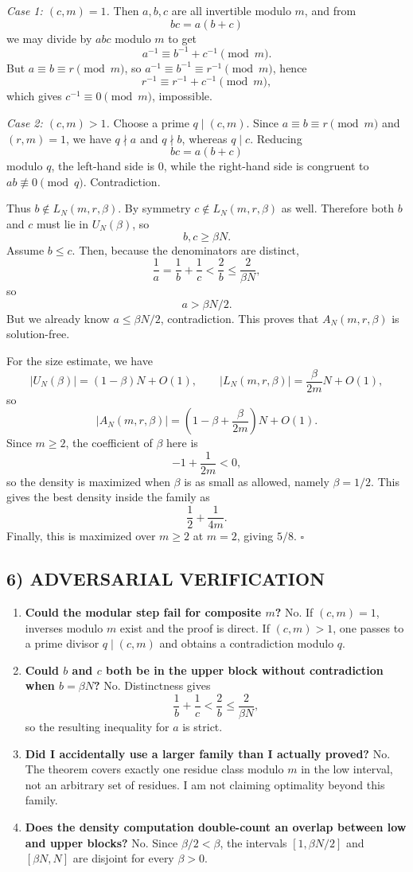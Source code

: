 \smallskip
\emph{Case 1: \((c,m)=1\).}
Then \(a,b,c\) are all invertible modulo \(m\), and from
\[
  bc=a(b+c)
\]
we may divide by \(abc\) modulo \(m\) to get
\[
  a^{-1}\equiv b^{-1}+c^{-1}\pmod m.
\]
But \(a\equiv b\equiv r\pmod m\), so \(a^{-1}\equiv b^{-1}\equiv r^{-1}\pmod m\), hence
\[
  r^{-1}\equiv r^{-1}+c^{-1}\pmod m,
\]
which gives \(c^{-1}\equiv 0\pmod m\), impossible.

\smallskip
\emph{Case 2: \((c,m)>1\).}
Choose a prime \(q\mid (c,m)\).
Since \(a\equiv b\equiv r\pmod m\) and \((r,m)=1\), we have \(q\nmid a\) and \(q\nmid b\), whereas \(q\mid c\).
Reducing
\[
  bc=a(b+c)
\]
modulo \(q\), the left-hand side is \(0\), while the right-hand side is congruent to \(ab\not\equiv 0\pmod q\).
Contradiction.

Thus \(b\notin L_N(m,r,\beta)\).
By symmetry \(c\notin L_N(m,r,\beta)\) as well.
Therefore both \(b\) and \(c\) must lie in \(U_N(\beta)\), so
\[
  b,c\ge \beta N.
\]
Assume \(b\le c\).
Then, because the denominators are distinct,
\[
  \frac1a=\frac1b+\frac1c<\frac{2}{b}\le \frac{2}{\beta N},
\]
so
\[
  a>\beta N/2.
\]
But we already know \(a\le \beta N/2\), contradiction.
This proves that \(A_N(m,r,\beta)\) is solution-free.

For the size estimate, we have
\[
  |U_N(\beta)|=(1-\beta)N+O(1),
\qquad
  |L_N(m,r,\beta)|=\frac{\beta}{2m}N+O(1),
\]
so
\[
  |A_N(m,r,\beta)|=\left(1-\beta+\frac{\beta}{2m}\right)N+O(1).
\]
Since \(m\ge 2\), the coefficient of \(\beta\) here is
\[
  -1+\frac{1}{2m}<0,
\]
so the density is maximized when \(\beta\) is as small as allowed, namely \(\beta=1/2\).
This gives the best density inside the family as
\[
  \frac12+\frac{1}{4m}.
\]
Finally, this is maximized over \(m\ge 2\) at \(m=2\), giving \(5/8\).
\hfill \(\square\)

\subsection*{6) ADVERSARIAL VERIFICATION}
\begin{enumerate}
\item \textbf{Could the modular step fail for composite \(m\)?}
No. If \((c,m)=1\), inverses modulo \(m\) exist and the proof is direct. If \((c,m)>1\), one passes to a prime divisor \(q\mid (c,m)\) and obtains a contradiction modulo \(q\).
\item \textbf{Could \(b\) and \(c\) both be in the upper block without contradiction when \(b=\beta N\)?}
No. Distinctness gives
\[
  \frac1b+\frac1c<\frac2b\le \frac{2}{\beta N},
\]
so the resulting inequality for \(a\) is strict.
\item \textbf{Did I accidentally use a larger family than I actually proved?}
No. The theorem covers exactly one residue class modulo \(m\) in the low interval, not an arbitrary set of residues. I am not claiming optimality beyond this family.
\item \textbf{Does the density computation double-count an overlap between low and upper blocks?}
No. Since \(\beta/2<\beta\), the intervals \([1,\beta N/2]\) and \([\beta N,N]\) are disjoint for every \(\beta>0\).
\end{enumerate}

